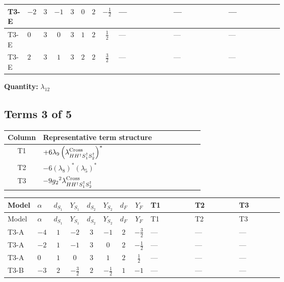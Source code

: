 \documentclass[8pt]{article}
\begin{document}
\begin{landscape}
\begin{longtable}{@{}llcccccc >{\raggedright\arraybackslash}p{0.21\linewidth} >{\raggedright\arraybackslash}p{0.21\linewidth} >{\raggedright\arraybackslash}p{0.21\linewidth}@{}}
\midrule
T3-E & $-2$ & $3$ & $-1$ & $3$ & $0$ & $2$ & $-\frac{1}{2}$ & --- & --- & --- \\
\midrule
T3-E & $0$ & $3$ & $0$ & $3$ & $1$ & $2$ & $\frac{1}{2}$ & --- & --- & --- \\
\midrule
T3-E & $2$ & $3$ & $1$ & $3$ & $2$ & $2$ & $\frac{3}{2}$ & --- & --- & --- \\
\midrule
\bottomrule
\end{longtable}
\clearpage
\noindent\textbf{Quantity: }$\lambda_{12}$\par\smallskip
\subsection*{Terms 3 of 5}
\begin{center}
\begin{tabular}{@{}c >{\raggedright\arraybackslash}p{0.82\linewidth}@{}}
\toprule
Column & Representative term structure \\
\midrule
T1 & \(\displaystyle +6 {\lambda_{9}} \left({\lambda_{H H^\dagger S_1^\dagger S_2^\dagger}^{\rm Cross}}\right)^{*}\) \\
\midrule
T2 & \(\displaystyle -6 \left({\lambda_{8}}\right)^{*} \left({\lambda_5}\right)^{*}\) \\
\midrule
T3 & \(\displaystyle -9 {g_2}^2 {\lambda_{H H^\dagger S_1^\dagger S_2^\dagger}^{\rm Cross}}\) \\
\midrule
\bottomrule
\end{tabular}
\end{center}
\smallskip
\tiny
\begin{longtable}{@{}llcccccc >{\raggedright\arraybackslash}p{0.21\linewidth} >{\raggedright\arraybackslash}p{0.21\linewidth} >{\raggedright\arraybackslash}p{0.21\linewidth}@{}}
\toprule
Model & $\alpha$ & $d_{S_1}$ & $Y_{S_1}$ & $d_{S_2}$ & $Y_{S_2}$ & $d_F$ & $Y_F$ & T1 & T2 & T3 \\
\midrule
\endfirsthead
\toprule
Model & $\alpha$ & $d_{S_1}$ & $Y_{S_1}$ & $d_{S_2}$ & $Y_{S_2}$ & $d_F$ & $Y_F$ & T1 & T2 & T3 \\
\midrule
\endhead
T3-A & $-4$ & $1$ & $-2$ & $3$ & $-1$ & $2$ & $-\frac{3}{2}$ & --- & --- & --- \\
\midrule
T3-A & $-2$ & $1$ & $-1$ & $3$ & $0$ & $2$ & $-\frac{1}{2}$ & --- & --- & --- \\
\midrule
T3-A & $0$ & $1$ & $0$ & $3$ & $1$ & $2$ & $\frac{1}{2}$ & --- & --- & --- \\
\midrule
T3-B & $-3$ & $2$ & $-\frac{3}{2}$ & $2$ & $-\frac{1}{2}$ & $1$ & $-1$ & --- & --- & --- \\

\end{longtable}
\end{landscape}
\end{document}
